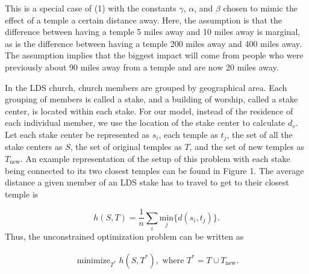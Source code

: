 \documentclass[twoside,twocolumn]{article}
\DeclareMathOperator*{\minimize}{minimize}
\begin{document}
This is a special case of (1) with the constants $\gamma$, $\alpha$, and $\beta$ chosen to mimic the effect of a temple a certain distance away.
Here, the assumption is that the difference between having a temple 5 miles away and 10 miles away is marginal, as is the difference between having a temple 200 miles away and 400 miles away.
The assumption implies that the biggest impact will come from people who were previously about 90 miles away from a temple and are now 20 miles away.

In the LDS church, church members are grouped by geographical area.
Each grouping of members is called a stake, and a building of worship, called a stake center, is located within each stake.
For our model, instead of the residence of each individual member, we use the location of the stake center to calculate $d_{v}$.
Let each stake center be represented as $s_i$, each temple as $t_j$, the set of all the stake centers as $S$, the set of original temples as $T$, and the set of new temples as $T_{\text{new}}$.
An example representation of the setup of this problem with each stake being connected to its two closest temples can be found in Figure 1.
The average distance a given member of an LDS stake has to travel to get to their closest temple is

\begin{equation*}
	h(S,T) = \frac{1}{n} \sum_i \underset{j}{\text{min}}\{d(s_i,t_j)\}.
\end{equation*}
Thus, the unconstrained optimization problem can be written as

\begin{equation*}
\begin{aligned}
	\minimize_{T^*} h(S,T^*), \text{ where } T^* = T \cup T_{\text{new}}.
\end{aligned}
\end{equation*}
\end{document}

